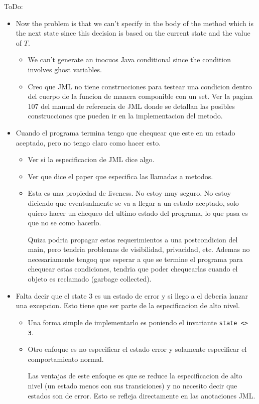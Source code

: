 \documentclass[a4paper,10pt]{article}
\begin{document}
ToDo:
\begin{itemize}
  \item Now the problem is that we can't specify in the body of the method which
is the next state since this decision is based on the current state and the
value of $T$.
  \begin{itemize}
    \item We can't generate an inocuos Java conditional since the condition
involves ghost variables.
    \item Creo que JML no tiene construcciones para testear una condicion
dentro del cuerpo de la funcion de manera componible con un set. Ver la pagina
107 del manual de referencia de JML donde se detallan las posibles
construcciones que pueden ir en la implementacion del metodo.
  \end{itemize}
  \item Cuando el programa termina tengo que chequear que este en un estado
aceptado, pero no tengo claro como hacer esto.
  \begin{itemize}
    \item Ver si la especificacion de JML dice algo.
    \item Ver que dice el paper que especifica las llamadas a metodos.
    \item Esta es una propiedad de liveness. No estoy muy seguro. No estoy
diciendo que eventualmente se va a llegar a un estado aceptado, solo quiero
hacer un chequeo del ultimo estado del programa, lo que pasa es que no se como
hacerlo.

  Quiza podria propagar estos requerimientos a una postcondicion del main, pero
tendria problemas de visibilidad, privacidad, etc. Ademas no necesariamente
tengoq que esperar a que se termine el programa para chequear estas
condiciones, tendria que poder chequearlas cuando el objeto es reclamado
(garbage collected).
  \end{itemize}
  \item Falta decir que el state 3 es un estado de error y si llego a el deberia
lanzar una excepcion. Esto tiene que ser parte de la especificacion de alto
nivel.
  \begin{itemize}
    \item Una forma simple de implementarlo es poniendo el invariante
\texttt{state <> 3}.
    \item Otro enfoque es no especificar el estado error y solamente
especificar el comportamiento normal.

Las ventajas de este enfoque es que se reduce la especificacion de alto nivel
(un estado menos con sus transiciones) y no necesito decir que estados son de
error. Esto se refleja directamente en las anotaciones JML.


\end{itemize}
\end{itemize}
\end{document}
